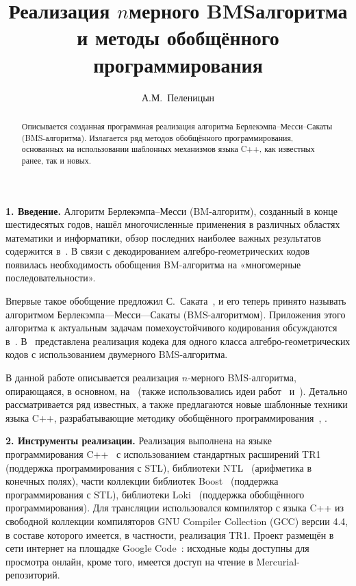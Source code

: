\documentclass[14pt]{extarticle}
\title{Реализация $n$\nbdash{}мерного BMS\nbdash{}алгоритма
и методы обобщённого программирования}
\date{}
\author{А.М.~Пеленицын}
\newcommand{\nspace}{\hspace{0pt}}
\newcommand{\nbdash}{\nobreakdash-\nspace}
\begin{document}
 
\maketitle
\begin{abstract}
Описывается созданная программная реализация алгоритма
Берлекэмпа–Месси–Сакаты (BMS\nbdash{}алгоритма). Излагается ряд методов 
обобщённого программирования, основанных на использовании шаблонных механизмов
языка C++, как известных ранее, так и новых.
\end{abstract}

\textbf{1. Введение.} Алгоритм Берлекэмпа–Месси (BM\nbdash{}алгоритм), созданный
в конце шестидесятых годов, нашёл многочисленные применения в различных областях
математики и информатики, обзор последних наиболее важных результатов содержится
в~\cite{Kurakin99}. В связи с декодированием алгебро-геометрических кодов
появилась необходимость обобщения BM\nbdash{}алгоритма на «многомерные
последовательности».

Впервые такое обобщение предложил С.~Саката~\cite{Sakata88}, \cite{Sakata90} и
его теперь принято называть алгоритмом Берлекэмпа—Месси—Сакаты
(BMS\nbdash{}алгоритмом). Приложения этого алгоритма к актуальным задачам
помехоустойчивого кодирования обсуждаются в~\cite{Sakata09a}. В~\cite{MayPel08}
представлена реализация кодека для одного класса алгебро-геометрических кодов с
использованием двумерного BMS-алгоритма.

В данной работе описывается реализация $n$\nbdash{}мерного BMS\nbdash{}алгоритма,
опирающаяся, в основном, на~\cite{CLO'S05} (также использовались идеи
работ~\cite{Sakata09} и~\cite{Sakata90}). Детально рассматривается ряд
известных, а также предлагаются новые шаблонные техники языка C++,
разрабатывающие методику обобщённого программирования~\cite[гл.~14]{VJ03},
\cite[п. 7.2]{Stroustrup07}.

\textbf{2. Инструменты реализации.} Реализация выполнена на языке
программирования C++~\cite{CppStd} с использованием стандартных расширений TR1~\cite{TR1}
(поддержка программирования с STL), библиотеки
NTL~\cite{NTL} (арифметика в конечных полях), части коллекции
библиотек Boost~\cite{Boost} (поддержка программирования с STL), библиотеки
Loki~\cite{loki} (поддержка обобщённого программирования). Для трансляции
использовался компилятор с языка C++ из свободной коллекции компиляторов GNU 
Compiler Collection (GCC) версии 4.4, в составе которого имеется, в частности, 
реализация TR1. Проект размещён в сети интернет на площадке Google
Code~\cite{cppmvpoly}: исходные коды доступны для просмотра онлайн, кроме того,
имеется доступ на чтение в Mercurial\nbdash{}репозиторий.
\end{document}
